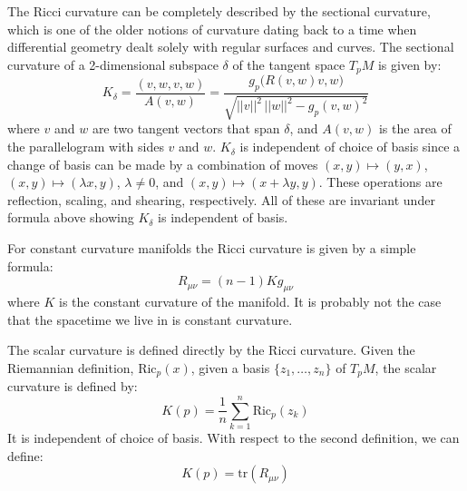 \documentclass{beamer}
\begin{document}
    \begin{frame}
        The Ricci curvature can be completely described by the sectional
        curvature, which is one of the older notions of curvature dating back
        to a time when differential geometry dealt solely with regular surfaces
        and curves. The sectional curvature of a 2-dimensional subspace
        $\delta$ of the tangent space $T_{p}M$ is given by:
        \begin{equation}
            K_{\delta}=\frac{(v,w,v,w)}{A(v,w)}
                =\frac{g_{p}\big(R(v,w)v,w\big)}{\sqrt{||v||^{2}\,||w||^{2}-g_{p}(v,w)^{2}}}
        \end{equation}
        where $v$ and $w$ are two tangent vectors that span $\delta$, and
        $A(v,w)$ is the area of the parallelogram with sides $v$ and $w$.
        $K_{\delta}$ is independent of choice of basis since a change of basis
        can be made by a combination of moves
        $(x,y)\mapsto(y,x)$, $(x,y)\mapsto(\lambda{x},y)$, $\lambda\ne{0}$, and
        $(x,y)\mapsto(x+\lambda{y},y)$. These operations are reflection,
        scaling, and shearing, respectively. All of these are invariant under
        formula above showing $K_{\delta}$ is independent of basis.
    \end{frame}
    \begin{frame}
        For constant curvature manifolds the Ricci curvature is given by a
        simple formula:
        \begin{equation}
            R_{\mu\nu}=(n-1)Kg_{\mu\nu}
        \end{equation}
        where $K$ is the constant curvature of the manifold.
        It is probably not the case that the spacetime we live in is constant
        curvature.
    \end{frame}
    \begin{frame}
        The scalar curvature is defined directly by the Ricci curvature. Given
        the Riemannian definition, $\textrm{Ric}_{p}(x)$, given a basis
        $\{z_{1},\dots,z_{n}\}$ of $T_{p}M$, the scalar curvature is defined by:
        \begin{equation}
            K(p)=\frac{1}{n}\sum_{k=1}^{n}\textrm{Ric}_{p}(z_{k})
        \end{equation}
        It is independent of choice of basis. With respect to the second
        definition, we can define:
        \begin{equation}
            K(p)=\textrm{tr}(R_{\mu\nu})
        \end{equation}
    \end{frame}
\end{document}
